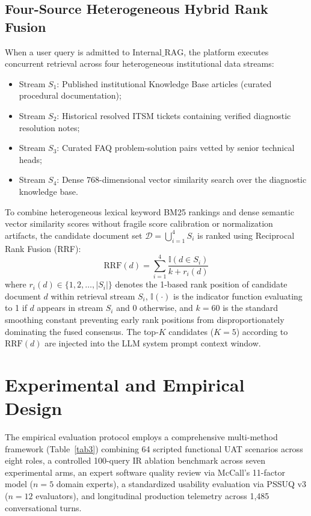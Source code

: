 \documentclass[conference]{IEEEtran}
\begin{document}
\subsection{Four-Source Heterogeneous Hybrid Rank Fusion}
When a user query is admitted to $\text{Internal\_RAG}$, the platform executes concurrent retrieval across four heterogeneous institutional data streams:
\begin{itemize}
    \item Stream $S_1$: Published institutional Knowledge Base articles (curated procedural documentation);
    \item Stream $S_2$: Historical resolved ITSM tickets containing verified diagnostic resolution notes;
    \item Stream $S_3$: Curated FAQ problem-solution pairs vetted by senior technical heads;
    \item Stream $S_4$: Dense 768-dimensional vector similarity search over the diagnostic knowledge base.
\end{itemize}
To combine heterogeneous lexical keyword BM25 rankings and dense semantic vector similarity scores without fragile score calibration or normalization artifacts, the candidate document set $\mathcal{D} = \bigcup_{i=1}^4 S_i$ is ranked using Reciprocal Rank Fusion (RRF):
\begin{equation}
\text{RRF}(d) = \sum_{i=1}^4 \frac{\mathbb{I}(d \in S_i)}{k + r_i(d)}
\end{equation}
where $r_i(d) \in \{1, 2, \dots, |S_i|\}$ denotes the 1-based rank position of candidate document $d$ within retrieval stream $S_i$, $\mathbb{I}(\cdot)$ is the indicator function evaluating to 1 if $d$ appears in stream $S_i$ and 0 otherwise, and $k = 60$ is the standard smoothing constant preventing early rank positions from disproportionately dominating the fused consensus. The top-$K$ candidates ($K = 5$) according to $\text{RRF}(d)$ are injected into the LLM system prompt context window.

\section{Experimental and Empirical Design}
The empirical evaluation protocol employs a comprehensive multi-method framework (Table~\ref{tab3}) combining 64 scripted functional UAT scenarios across eight roles, a controlled 100-query IR ablation benchmark across seven experimental arms, an expert software quality review via McCall's 11-factor model ($n = 5$ domain experts), a standardized usability evaluation via PSSUQ v3 ($n = 12$ evaluators), and longitudinal production telemetry across 1,485 conversational turns.
\end{document}

